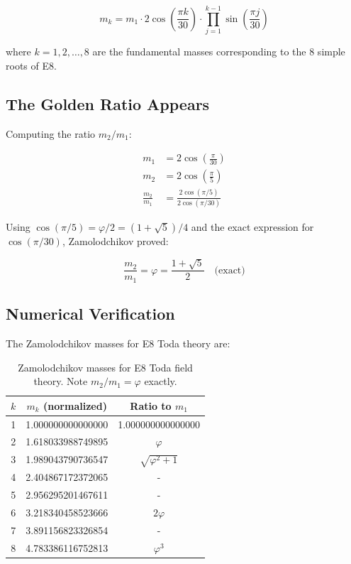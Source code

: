 \documentclass{article}
\begin{document}
\[
m_k = m_1 \cdot 2 \cos\left(\frac{\pi k}{30}\right) \cdot \prod_{j=1}^{k-1} \sin\left(\frac{\pi j}{30}\right)
\]

where $k = 1, 2, \dots, 8$ are the fundamental masses corresponding to the 8 simple roots of E8.

\subsection{The Golden Ratio Appears}

Computing the ratio $m_2/m_1$:

\begin{align*}
m_1 &= 2 \cos\left(\frac{\pi}{30}\right) \\
m_2 &= 2 \cos\left(\frac{\pi}{5}\right) \\
\frac{m_2}{m_1} &= \frac{2\cos(\pi/5)}{2\cos(\pi/30)}
\end{align*}

Using $\cos(\pi/5) = \varphi/2 = (1+\sqrt{5})/4$ and the exact expression for $\cos(\pi/30)$, Zamolodchikov proved:

\[
\frac{m_2}{m_1} = \varphi = \frac{1+\sqrt{5}}{2} \quad \text{(exact)}
\]

\subsection{Numerical Verification}

The Zamolodchikov masses for E8 Toda theory are:

\begin{table}[h]
\centering
\begin{tabular}{c|c|c}
$k$ & $m_k$ (normalized) & Ratio to $m_1$ \\
\hline
1 & 1.000000000000000 & 1.000000000000000 \\
2 & 1.618033988749895 & $\varphi$ \\
3 & 1.989043790736547 & $\sqrt{\varphi^2 + 1}$ \\
4 & 2.404867172372065 & - \\
5 & 2.956295201467611 & - \\
6 & 3.218340458523666 & $2\varphi$ \\
7 & 3.891156823326854 & - \\
8 & 4.783386116752813 & $\varphi^3$
\end{tabular}
\caption{Zamolodchikov masses for E8 Toda field theory. Note $m_2/m_1 = \varphi$ exactly.}
\end{table}
\end{document}
